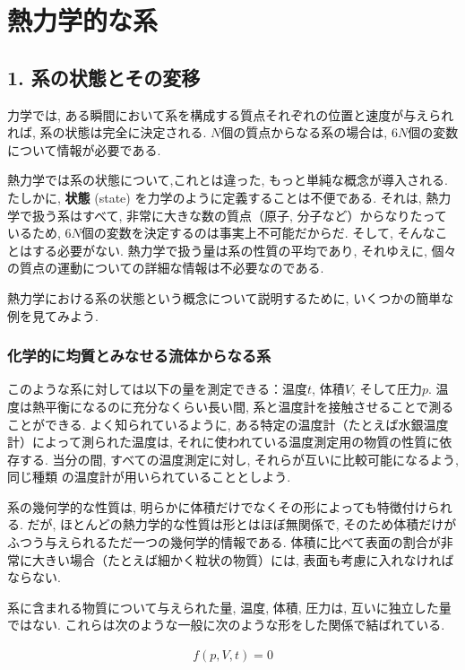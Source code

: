 
\chapter{熱力学的な系}
\section*{1. 系の状態とその変移}
力学では, ある瞬間において系を構成する質点それぞれの位置と速度が与えられれば, 系の状態は完全に決定される. $N$個の質点からなる系の場合は, $6N$個の変数について情報が必要である.\par
熱力学では系の状態について,これとは違った, もっと単純な概念が導入される. たしかに, \textbf{状態} (state) を力学のように定義することは不便である. それは, 熱力学で扱う系はすべて, 非常に大きな数の質点（原子, 分子など）からなりたっているため, $6N$個の変数を決定するのは事実上不可能だからだ. そして, そんなことはする必要がない. 熱力学で扱う量は系の性質の平均であり, それゆえに, 個々の質点の運動についての詳細な情報は不必要なのである.\par
熱力学における系の状態という概念について説明するために, いくつかの簡単な例を見てみよう.\par

\subsection*{化学的に均質とみなせる流体からなる系}
このような系に対しては以下の量を測定できる：温度$t$, 体積$V$, そして圧力$p$. 温度は熱平衡になるのに充分なくらい長い間, 系と温度計を接触させることで測ることができる. よく知られているように, ある特定の温度計（たとえば水銀温度計）によって測られた温度は, それに使われている温度測定用の物質の性質に依存する. 当分の間, すべての温度測定に対し, それらが互いに比較可能になるよう, 同じ種類
の温度計が用いられていることとしよう.\par
系の幾何学的な性質は, 明らかに体積だけでなくその形によっても特徴付けられる. だが, ほとんどの熱力学的な性質は形とはほぼ無関係で, そのため体積だけがふつう与えられるただ一つの幾何学的情報である. 体積に比べて表面の割合が非常に大きい場合（たとえば細かく粒状の物質）には, 表面も考慮に入れなければならない.\par
系に含まれる物質について与えられた量, 温度, 体積, 圧力は, 互いに独立した量ではない. これらは次のような一般に次のような形をした関係で結ばれている.

\begin{align}\tag{1}
 f(p,V,t)=0
\end{align}

